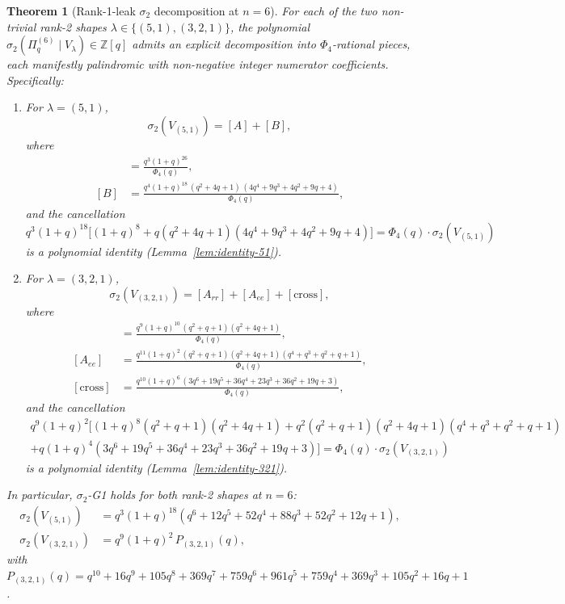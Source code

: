\documentclass[11pt]{article}
\theoremstyle{plain}
\newtheorem{theorem}{Theorem}
\theoremstyle{definition}
\theoremstyle{remark}
\newcommand{\Z}{\mathbb{Z}}
\newcommand{\Pibs}{\Pi_q}
\begin{document}
\begin{theorem}[Rank-1-leak $\sigma_2$ decomposition at $n=6$]\label{thm:main}
For each of the two non-trivial rank-2 shapes
$\lambda \in \{(5,1), (3,2,1)\}$, the polynomial
$\sigma_2(\Pibs^{(6)} \mid V_\lambda) \in \Z[q]$ admits an explicit
decomposition into $\Phi_4$-rational pieces, each manifestly palindromic
with non-negative integer numerator coefficients. Specifically:
\begin{enumerate}[label=(\alph*)]
\item For $\lambda = (5,1)$,
\[
  \sigma_2(V_{(5,1)}) = [A] + [B],
\]
where
\begin{align*}
  [A] &= \frac{q^3 (1+q)^{26}}{\Phi_4(q)}, \\
  [B] &= \frac{q^4 (1+q)^{18} \,(q^2+4q+1)\,(4q^4 + 9q^3 + 4q^2 + 9q + 4)}{\Phi_4(q)},
\end{align*}
and the cancellation
\[
  q^3(1+q)^{18}\bigl[(1+q)^8 + q (q^2+4q+1)(4q^4+9q^3+4q^2+9q+4)\bigr]
    = \Phi_4(q)\cdot \sigma_2(V_{(5,1)})
\]
is a polynomial identity (Lemma~\ref{lem:identity-51}).

\item For $\lambda = (3,2,1)$,
\[
  \sigma_2(V_{(3,2,1)}) = [A_{rr}] + [A_{ee}] + [\mathrm{cross}],
\]
where
\begin{align*}
  [A_{rr}] &= \frac{q^9 (1+q)^{10} \,(q^2+q+1)(q^2+4q+1)}{\Phi_4(q)}, \\
  [A_{ee}] &= \frac{q^{11} (1+q)^2 \,(q^2+q+1)(q^2+4q+1)(q^4+q^3+q^2+q+1)}{\Phi_4(q)}, \\
  [\mathrm{cross}] &= \frac{q^{10} (1+q)^6 \,(3q^6+19q^5+36q^4+23q^3+36q^2+19q+3)}{\Phi_4(q)},
\end{align*}
and the cancellation
\begin{multline*}
  q^9(1+q)^2\bigl[(1+q)^8 (q^2+q+1)(q^2+4q+1) + q^2 (q^2+q+1)(q^2+4q+1)(q^4+q^3+q^2+q+1) \\
   + q (1+q)^4 (3q^6+19q^5+36q^4+23q^3+36q^2+19q+3)\bigr]
    = \Phi_4(q) \cdot \sigma_2(V_{(3,2,1)})
\end{multline*}
is a polynomial identity (Lemma~\ref{lem:identity-321}).
\end{enumerate}
In particular, $\sigma_2$-G1 holds for both rank-2 shapes at $n=6$:
\begin{align*}
  \sigma_2(V_{(5,1)}) &= q^3(1+q)^{18}(q^6 + 12q^5 + 52q^4 + 88q^3 + 52q^2 + 12q + 1), \\
  \sigma_2(V_{(3,2,1)}) &= q^9(1+q)^2 \,P_{(3,2,1)}(q),
\end{align*}
with $P_{(3,2,1)}(q) = q^{10} + 16q^9 + 105q^8 + 369q^7 + 759q^6 + 961q^5 + 759q^4 + 369q^3 + 105q^2 + 16q + 1$.
\end{theorem}
\end{document}
